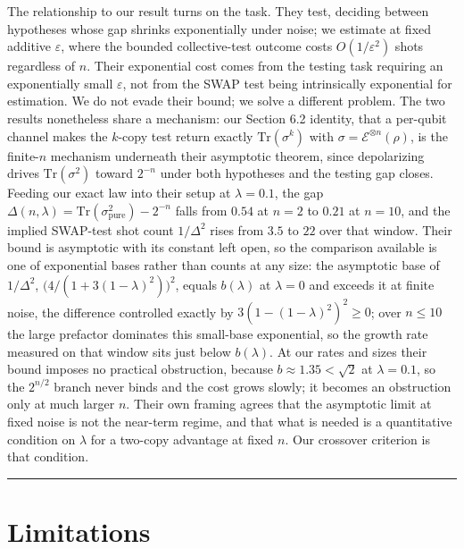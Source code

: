 \documentclass[a4paper,superscriptaddress,nofootinbib,onecolumn,nopdfoutputerror]{quantumarticle}
\begin{document}
The relationship to our result turns on the task. They test, deciding
between hypotheses whose gap shrinks exponentially under noise; we
estimate at fixed additive \(\varepsilon\), where the bounded
collective-test outcome costs \(O(1/\varepsilon^2)\) shots regardless of
\(n\). Their exponential cost comes from the testing task requiring an
exponentially small \(\varepsilon\), not from the SWAP test being
intrinsically exponential for estimation. We do not evade their bound; we
solve a different problem. The two results nonetheless share a mechanism:
our Section 6.2 identity, that a per-qubit channel makes the \(k\)-copy
test return exactly \(\mathrm{Tr}(\sigma^k)\) with
\(\sigma = \mathcal{E}^{\otimes n}(\rho)\), is the finite-\(n\) mechanism
underneath their asymptotic theorem, since depolarizing drives
\(\mathrm{Tr}(\sigma^2)\) toward \(2^{-n}\) under both hypotheses and the
testing gap closes. Feeding our exact law into their setup at
\(\lambda = 0.1\), the gap
\(\Delta(n,\lambda) = \mathrm{Tr}(\sigma_{\text{pure}}^2) - 2^{-n}\) falls
from \(0.54\) at \(n=2\) to \(0.21\) at \(n=10\), and the implied
SWAP-test shot count \(1/\Delta^2\) rises from \(3.5\) to \(22\) over that
window. Their bound is asymptotic with its constant left open, so the
comparison available is one of exponential bases rather than counts at any
size: the asymptotic base of \(1/\Delta^2\),
\(\big(4/(1+3(1-\lambda)^2)\big)^2\), equals \(b(\lambda)\) at
\(\lambda = 0\) and exceeds it at finite noise, the difference controlled
exactly by \(3(1-(1-\lambda)^2)^2 \ge 0\); over \(n \le 10\) the large
prefactor dominates this small-base exponential, so the growth rate
measured on that window sits just below \(b(\lambda)\). At our rates and
sizes their bound imposes no practical obstruction, because
\(b \approx 1.35 < \sqrt{2}\) at \(\lambda = 0.1\), so the \(2^{n/2}\)
branch never binds and the cost grows slowly; it becomes an obstruction
only at much larger \(n\). Their own framing agrees that the asymptotic
limit at fixed noise is not the near-term regime, and that what is needed
is a quantitative condition on \(\lambda\) for a two-copy advantage at
fixed \(n\). Our crossover criterion is that condition.


\begin{center}\rule{0.5\linewidth}{0.5pt}\end{center}

\hypertarget{limitations}{%
\section{Limitations}\label{limitations}}
\end{document}
